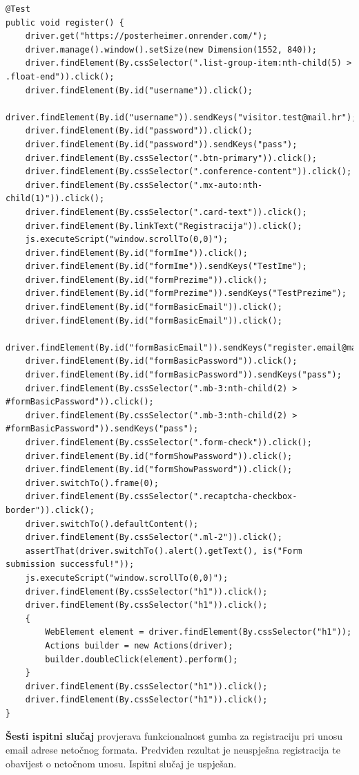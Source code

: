			\begin{lstlisting}
@Test
public void register() {
	driver.get("https://posterheimer.onrender.com/");
	driver.manage().window().setSize(new Dimension(1552, 840));
	driver.findElement(By.cssSelector(".list-group-item:nth-child(5) > .float-end")).click();
	driver.findElement(By.id("username")).click();
	driver.findElement(By.id("username")).sendKeys("visitor.test@mail.hr");
	driver.findElement(By.id("password")).click();
	driver.findElement(By.id("password")).sendKeys("pass");
	driver.findElement(By.cssSelector(".btn-primary")).click();
	driver.findElement(By.cssSelector(".conference-content")).click();
	driver.findElement(By.cssSelector(".mx-auto:nth-child(1)")).click();
	driver.findElement(By.cssSelector(".card-text")).click();
	driver.findElement(By.linkText("Registracija")).click();
	js.executeScript("window.scrollTo(0,0)");
	driver.findElement(By.id("formIme")).click();
	driver.findElement(By.id("formIme")).sendKeys("TestIme");
	driver.findElement(By.id("formPrezime")).click();
	driver.findElement(By.id("formPrezime")).sendKeys("TestPrezime");
	driver.findElement(By.id("formBasicEmail")).click();
	driver.findElement(By.id("formBasicEmail")).click();
	driver.findElement(By.id("formBasicEmail")).sendKeys("register.email@mail.hr");
	driver.findElement(By.id("formBasicPassword")).click();
	driver.findElement(By.id("formBasicPassword")).sendKeys("pass");
	driver.findElement(By.cssSelector(".mb-3:nth-child(2) > #formBasicPassword")).click();
	driver.findElement(By.cssSelector(".mb-3:nth-child(2) > #formBasicPassword")).sendKeys("pass");
	driver.findElement(By.cssSelector(".form-check")).click();
	driver.findElement(By.id("formShowPassword")).click();
	driver.findElement(By.id("formShowPassword")).click();
	driver.switchTo().frame(0);
	driver.findElement(By.cssSelector(".recaptcha-checkbox-border")).click();
	driver.switchTo().defaultContent();
	driver.findElement(By.cssSelector(".ml-2")).click();
	assertThat(driver.switchTo().alert().getText(), is("Form submission successful!"));
	js.executeScript("window.scrollTo(0,0)");
	driver.findElement(By.cssSelector("h1")).click();
	driver.findElement(By.cssSelector("h1")).click();
	{
		WebElement element = driver.findElement(By.cssSelector("h1"));
		Actions builder = new Actions(driver);
		builder.doubleClick(element).perform();
	}
	driver.findElement(By.cssSelector("h1")).click();
	driver.findElement(By.cssSelector("h1")).click();
}
			\end{lstlisting}

\textbf{Šesti ispitni slučaj} provjerava funkcionalnost gumba za registraciju pri unosu email adrese netočnog formata. Predviđen rezultat je neuspješna registracija te obavijest o netočnom unosu. Ispitni slučaj je uspješan.		

